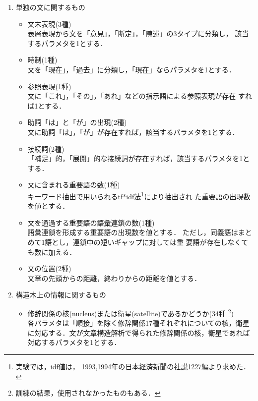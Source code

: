 \begin{enumerate}
 \item 単独の文に関するもの
\begin{itemize}
 \item 文末表現(3種)\\
       表層表現から文を「意見」，「断定」，「陳述」の3タイプに分類し，
       該当するパラメタを1とする．

 \item 時制(1種)\\
       文を「現在」，「過去」に分類し，「現在」ならパラメタを1とする．

 \item 参照表現(1種)\\
       文に「これ」，「その」，「あれ」などの指示語による参照表現が存在
       すれば1とする．

 \item 助詞「は」と「が」の出現(2種)\\
       文に助詞「は」，「が」が存在すれば，該当するパラメタを1とする．

 \item 接続詞(2種)\\
       「補足」的，「展開」的な接続詞が存在すれば，該当するパラメタを1と
       する．

 \item 文に含まれる重要語の数(1種)\\
       キーワード抽出で用いられるtf*idf法\footnote{実験では，idf値は，
       1993,1994年の日本経済新聞の社説1227編より求めた．}により抽出され
       た重要語の出現数を値とする．

 \item 文を通過する重要語の語彙連鎖の数(1種)\\
       語彙連鎖を形成する重要語の出現数を値とする．
       ただし，同義語はまとめて1語とし，連鎖中の短いギャップに対しては重
       要語が存在しなくても数に加える．

 \item 文の位置(2種)\\
       文章の先頭からの距離，終わりからの距離を値とする．
\end{itemize}

 \item 構造木上の情報に関するもの
\begin{itemize}
 \item 修辞関係の核(nucleus)または衛星(satellite)であるかどうか(34種
       \footnote{訓練の結果，使用されなかったものもある．})
       \\
       各パラメタは「順接」を除く修辞関係17種それぞれについての核，衛星
       に対応する．文が文章構造解析で得られた修辞関係の核，衛星であれば
       対応するパラメタを1とする．


\end{itemize}
\end{enumerate}
